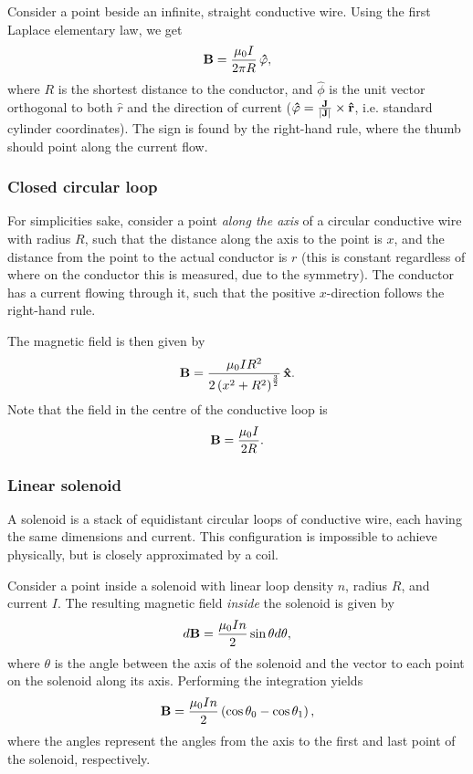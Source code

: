         Consider a point beside an infinite, straight conductive wire. Using the first Laplace elementary law, we get 
        \begin{equation}
            \B = \frac{\mu_0 I}{2\pi R}\,\hat{\phi},
        \end{equation}
        where $R$ is the shortest distance to the conductor, 
        and $\hat{\phi}$ is the  unit vector orthogonal to both $\hat{r}$ and the direction of current 
        ($\hat{\phi} = \frac{\j}{|\j|}\times\hat{r}$, i.e. standard cylinder coordinates).
        The sign is found by the right-hand rule, where the thumb should point along the current flow.
        
    \subsubsection*{Closed circular loop}
        For simplicities sake, consider a point \textit{along the axis} of a circular conductive wire with radius $R$, 
        such that the distance along the axis to the point is $x$, 
        and the distance from the point to the actual conductor is $r$ 
        (this is constant regardless of where on the conductor this is measured, due to the symmetry).
        The conductor has a current flowing through it, such that the positive $x$-direction follows the right-hand rule. 

        The magnetic field is then given by
        \begin{equation}
            \B = \frac{\mu_0 I R^2}{2 \left(x^2 + R^2\right)^\frac{3}{2}}\,\hat{x}.
        \end{equation}
        Note that the field in the centre of the conductive loop is
        \begin{equation}
            \mathbf{B} = \frac{\mu_0 I}{2R}.
        \end{equation}
    
    \subsubsection*{Linear solenoid}
        A solenoid is a stack of equidistant circular loops of conductive wire, each having the same dimensions and current. 
        This configuration is impossible to achieve physically, but is closely approximated by a coil. 

        Consider a point inside a solenoid with linear loop density $n$, radius $R$, and current $I$. 
        The resulting magnetic field \textit{inside} the solenoid is given by
        \begin{equation}
            d\mathbf{B} = \frac{\mu_0 I n}{2}\sin\theta d\theta,
        \end{equation}
        where $\theta$ is the angle between the axis of the solenoid and the vector to each point on the solenoid along its axis.
        Performing the integration yields
        \begin{equation}
            \mathbf{B} = \frac{\mu_0 In}{2}\left(\cos\theta_0 - \cos\theta_1\right),
        \end{equation}
        where the angles represent the angles from the axis to the first and last point of the solenoid, respectively. 

